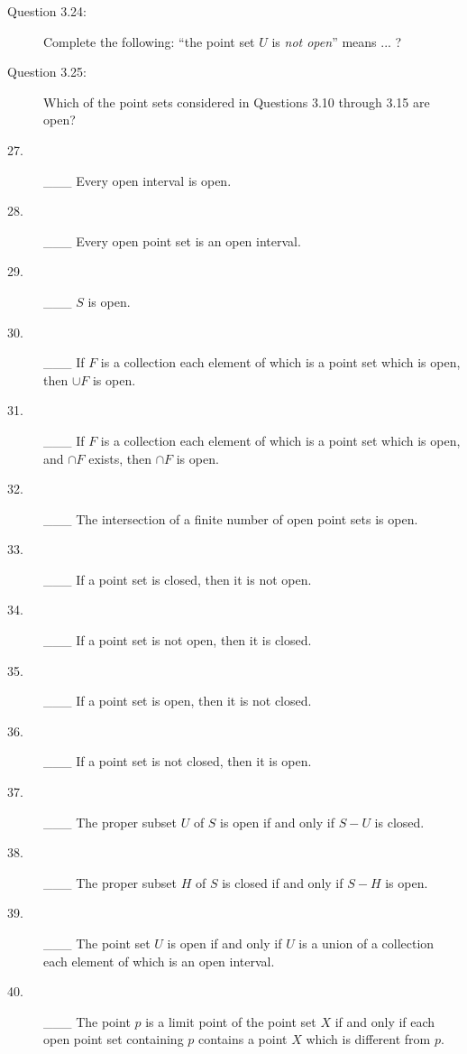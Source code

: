 \documentclass{book}
\begin{document}
\begin{description}
\item[Question 3.24:] Complete the following: ``the point set $U$ is \emph{not open}'' means ... ?

\item[Question 3.25:] Which of the point sets considered in Questions 3.10 through 3.15 are open?

\item[27.] \_\_\_ Every open interval is open.

\item[28.] \_\_\_ Every open point set is an open interval.

\item[29.] \_\_\_ $S$ is open.

\item[30.] \_\_\_ If $F$ is a collection each element of which is a point set which is open, then $\cup F$ is open.

\item[31.] \_\_\_ If $F$ is a collection each element of which is a point set which is open, and $\cap F$ exists, then $\cap F$ is open.

\item[32.] \_\_\_ The intersection of a finite number of open point sets is open.

\item[33.] \_\_\_ If a point set is closed, then it is not open.

\item[34.] \_\_\_ If a point set is not open, then it is closed.

\item[35.] \_\_\_ If a point set is open, then it is not closed.

\item[36.] \_\_\_ If a point set is not closed, then it is open.

\item[37.] \_\_\_ The proper subset $U$ of $S$ is open if and only if $S - U$ is closed.

\item[38.] \_\_\_ The proper subset $H$ of $S$ is closed if and only if $S - H$ is open.

\item[39.] \_\_\_ The point set $U$ is open if and only if $U$ is a union of a collection each element of which is an open interval.

\item[40.] \_\_\_ The point $p$ is a limit point of the point set $X$ if and only if each open point set containing $p$ contains a point $X$ which is different from $p$.


\end{description}
\end{document}
